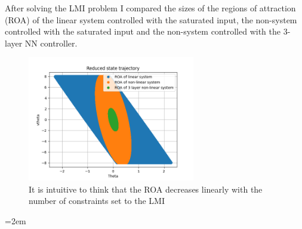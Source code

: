 \documentclass{article}
\begin{document}
After solving the LMI problem I compared the sizes of the regions of attraction (ROA) of the linear system controlled with the saturated input, the non-system controlled with the saturated input and the non-system controlled with the 3-layer NN controller. 


\begin{figure}[H]
    \centering
    \includegraphics[width=0.65\textwidth]{ROA_comparison}
    \caption{It is intuitive to think that the ROA decreases linearly with the number of constraints set to the LMI}
\end{figure}


\pagebreak
\emergencystretch=2em %
\printbibliography
\end{document}
